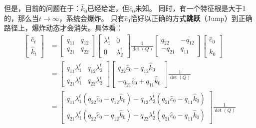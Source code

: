 但是，目前的问题在于：$\hat{k}_0$已经给定，但$\hat{c}_0$未知。
同时，有一个特征根是大于1的，那么当$t\rightarrow \infty$，系统会爆炸。
只有$\hat{c}_0$恰好以正确的方式\textbf{跳跃}（Jump）到正确路径上，爆炸动态才会消失。具体看：
\[
    \begin{aligned}
        \begin{bmatrix}
            \hat{c}_{t} \\
            \hat{k}_{t}
        \end{bmatrix}
        &=
        \begin{bmatrix}
            q_{11} & q_{12} \\
            q_{21} & q_{22}
        \end{bmatrix}
        \begin{bmatrix}
            \lambda_1^t & 0 \\
            0 & \lambda_2^t
        \end{bmatrix}
        \frac{1}{\operatorname{det}(Q)}
        \begin{bmatrix}
            q_{22} & -q_{12} \\
            -q_{21} & q_{11}
        \end{bmatrix}
        \begin{bmatrix}
            \hat{c}_0 \\
            \hat{k}_0
        \end{bmatrix}   \\
        &=
        \begin{bmatrix}
            q_{11} \lambda_1^t & q_{12} \lambda_2^t \\
            q_{21} \lambda_1^t & q_{22} \lambda_2^t
        \end{bmatrix}
        \begin{bmatrix}
            q_{22} \hat{c}_0-q_{12} \hat{k}_0 \\
            -q_{21} \hat{c}_0+q_{11} \hat{k}_0
        \end{bmatrix}
        \frac{1}{\operatorname{det}(Q)} \\
        &=
        \begin{bmatrix}
            q_{11} \lambda_1^t\left(q_{22} \hat{c}_0-q_{12} \hat{k}_0\right) - 
            q_{12} \lambda_2^t\left(q_{21} \hat{c}_0-q_{11} \hat{k}_0\right) \\
            q_{21} \lambda_1^t\left(q_{22} \hat{c}_0-q_{12} \hat{k}_0\right) - 
            q_{22} \lambda_2^t\left(q_{21} \hat{c}_0-q_{11} \hat{k}_0\right)
        \end{bmatrix}
        \frac{1}{\operatorname{det}(Q)}
    \end{aligned}
\]
